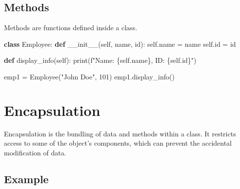 \documentclass[
  letterpaper,
  DIV=11,
  numbers=noendperiod]{scrreprt}
\newenvironment{Shaded}{\begin{snugshade}}{\end{snugshade}}
\newcommand{\BuiltInTok}[1]{\textcolor[rgb]{0.00,0.23,0.31}{#1}}
\newcommand{\DecValTok}[1]{\textcolor[rgb]{0.68,0.00,0.00}{#1}}
\newcommand{\FunctionTok}[1]{\textcolor[rgb]{0.28,0.35,0.67}{#1}}
\newcommand{\KeywordTok}[1]{\textcolor[rgb]{0.00,0.23,0.31}{\textbf{#1}}}
\newcommand{\NormalTok}[1]{\textcolor[rgb]{0.00,0.23,0.31}{#1}}
\newcommand{\OperatorTok}[1]{\textcolor[rgb]{0.37,0.37,0.37}{#1}}
\newcommand{\SpecialCharTok}[1]{\textcolor[rgb]{0.37,0.37,0.37}{#1}}
\newcommand{\SpecialStringTok}[1]{\textcolor[rgb]{0.13,0.47,0.30}{#1}}
\newcommand{\StringTok}[1]{\textcolor[rgb]{0.13,0.47,0.30}{#1}}
\newcommand{\VariableTok}[1]{\textcolor[rgb]{0.07,0.07,0.07}{#1}}
\begin{document}
\subsection{Methods}\label{methods}

Methods are functions defined inside a class.

\begin{Shaded}
\begin{Highlighting}[]
\KeywordTok{class}\NormalTok{ Employee:}
    \KeywordTok{def} \FunctionTok{\_\_init\_\_}\NormalTok{(}\VariableTok{self}\NormalTok{, name, }\BuiltInTok{id}\NormalTok{):}
        \VariableTok{self}\NormalTok{.name }\OperatorTok{=}\NormalTok{ name}
        \VariableTok{self}\NormalTok{.}\BuiltInTok{id} \OperatorTok{=} \BuiltInTok{id}
    
    \KeywordTok{def}\NormalTok{ display\_info(}\VariableTok{self}\NormalTok{):}
        \BuiltInTok{print}\NormalTok{(}\SpecialStringTok{f"Name: }\SpecialCharTok{\{}\VariableTok{self}\SpecialCharTok{.}\NormalTok{name}\SpecialCharTok{\}}\SpecialStringTok{, ID: }\SpecialCharTok{\{}\VariableTok{self}\SpecialCharTok{.}\BuiltInTok{id}\SpecialCharTok{\}}\SpecialStringTok{"}\NormalTok{)}

\NormalTok{emp1 }\OperatorTok{=}\NormalTok{ Employee(}\StringTok{"John Doe"}\NormalTok{, }\DecValTok{101}\NormalTok{)}
\NormalTok{emp1.display\_info()}
\end{Highlighting}
\end{Shaded}

\section{Encapsulation}\label{encapsulation-1}

Encapsulation is the bundling of data and methods within a class. It
restricts access to some of the object's components, which can prevent
the accidental modification of data.

\subsection{Example}\label{example-7}
\end{document}
